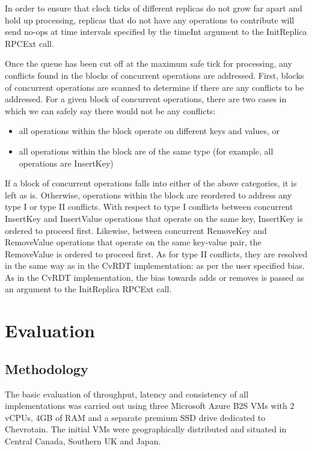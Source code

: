 \documentclass[sigconf,nonacm,10pt]{acmart}
\begin{document}
In order to ensure that clock ticks of different replicas do not grow far apart and hold up processing, replicas that do not have any operations to contribute will send no-ops at time intervals specified by the timeInt argument to the InitReplica RPCExt call.

Once the queue has been cut off at the maximum safe tick for processing, any conflicts found in the blocks of concurrent operations are addressed. First, blocks of concurrent operations are scanned to determine if there are any conflicts to be addressed. For a given block of concurrent operations, there are two cases in which we can safely say there would not be any conflicts:
\begin{itemize}
 \item all operations within the block operate on different keys and values, or
 \item all operations within the block are of the same type (for example, all operations are InsertKey)
\end{itemize}

If a block of concurrent operations falls into either of the above categories, it is left as is. Otherwise, operations within the block are reordered to address any type I or type II conflicts. With respect to type I conflicts between concurrent InsertKey and InsertValue operations that operate on the same key, InsertKey is ordered to proceed first. Likewise, between concurrent RemoveKey and RemoveValue operations that operate on the same key-value pair, the RemoveValue is ordered to proceed first. As for type II conflicts, they are resolved in the same way as in the CvRDT implementation: as per the user specified bias. As in the CvRDT implementation, the bias towards adds or removes is passed as an argument to the InitReplica RPCExt call.

\section{Evaluation}
\subsection{Methodology}
The basic evaluation of throughput, latency and consistency of all implementations was carried out using three Microsoft Azure B2S VMs with 2 vCPUs, 4GB of RAM and a separate premium SSD drive dedicated to Chevrotain. The initial VMs were geographically distributed and situated in Central Canada, Southern UK and Japan.
\end{document}
